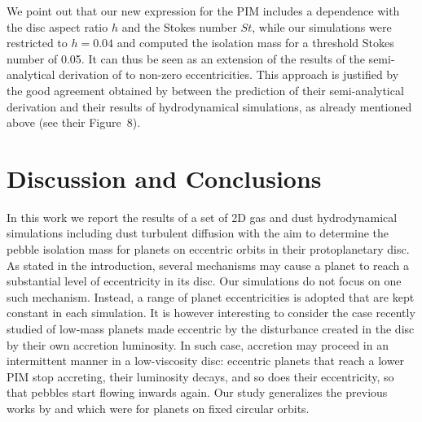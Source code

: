 \documentclass[fleqn,usenatbib]{mnras}
\begin{document}
We point out that our new expression for the PIM includes a dependence with the disc aspect ratio $h$ and the Stokes number $St$, while our simulations were restricted to $h=0.04$ and computed the isolation mass for a threshold Stokes number of 0.05. It can thus be seen as an extension of the results of the semi-analytical derivation of \citet{Ataiee_etal2018} to non-zero eccentricities. This approach is justified by the good agreement obtained by \citet{Ataiee_etal2018} between the prediction of their semi-analytical derivation and their results of hydrodynamical simulations, as already mentioned above (see their Figure~8).


\section{Discussion and Conclusions}
\label{sec:conclusion}
In this work we report the results of a set of 2D gas and dust hydrodynamical simulations including dust turbulent diffusion with the aim to determine the pebble isolation mass for planets on eccentric orbits in their protoplanetary disc. As stated in the introduction, several mechanisms may cause a planet to reach a substantial level of eccentricity in its disc. Our simulations do not focus on one such mechanism. Instead, a range of planet eccentricities is adopted that are kept constant in each simulation. It is however interesting to consider the case recently studied \citep[][]{2017MNRAS.469..206E,2019MNRAS.485.5035F} of low-mass planets made eccentric by the disturbance created in the disc by their own accretion luminosity. In such case, accretion may proceed in an intermittent manner in a low-viscosity disc: eccentric planets that reach a lower PIM stop accreting, their luminosity decays, and so does their eccentricity, so that pebbles start flowing inwards again. Our study generalizes the previous works by \citet{Bitsch_etal2018} and \citet{Ataiee_etal2018} which were for planets on fixed circular orbits.
\end{document}
